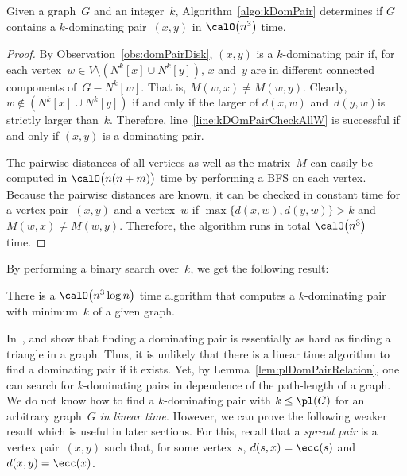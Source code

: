 \begin{theorem}
Given a graph~\( G \) and an integer~\( k \), Algorithm~\ref{algo:kDomPair} determines if \( G \) contains a \( k \)-dominating pair~\( (x, y) \) in \( \calO \! \left( n^3 \right) \) time.
\end{theorem}

\begin{proof}
By Observation~\ref{obs:domPairDisk}, $(x, y)$ is a $k$-dominating pair if, for each vertex~$w \in V \setminus \left( N^k[x] \cup N^k[y] \right)$, $x$ and~$y$ are in different connected components of~$G - N^k[w]$.
That is, $M(w, x) \neq M(w, y)$.
Clearly, $w \notin \left( N^k[x] \cup N^k[y] \right)$ if and only if the larger of $d(x, w)$ and~$d(y, w)$is strictly larger than~$k$.
Therefore, line~\ref{line:kDOmPairCheckAllW} is successful if and only if $(x, y)$ is a dominating pair.

The pairwise distances of all vertices as well as the matrix~$M$ can easily be computed in $\calO \big( n(n + m) \big)$ time by performing a BFS on each vertex.
Because the pairwise distances are known, it can be checked in constant time for a vertex pair~$(x, y)$ and a vertex~$w$ if $\max \big \{ d(x, w), d(y, w) \big \} > k$ and $M(w, x) \neq M(w, y)$.
Therefore, the algorithm runs in total $\calO \! \left( n^3 \right)$ time.
\end{proof}

By performing a binary search over~$k$, we get the following result:

\begin{corollary}
There is a \( \calO \! \left( n^3 \log n \right) \) time algorithm that computes a \( k \)-dominating pair with minimum~\( k \) of a given graph.
\end{corollary}

In~\cite{KratscSpinra2006},  and  show that finding a dominating pair is essentially as hard as finding a triangle in a graph.
Thus, it is unlikely that there is a linear time algorithm to find a dominating pair if it exists.
Yet, by Lemma~\ref{lem:plDomPairRelation}, one can search for $k$-dominating pairs in dependence of the path-length of a graph.
We do not know how to find a $k$-dominating pair with $k \leq \pl(G)$ for an arbitrary graph~$G$ \emph{in linear time}.
However, we can prove the following weaker result which is useful in later sections.
For this, recall that a \emph{spread pair} is a vertex pair~$(x, y)$ such that, for some vertex~$s$, $d(s, x) = \ecc(s)$ and $d(x, y) = \ecc(x)$.

